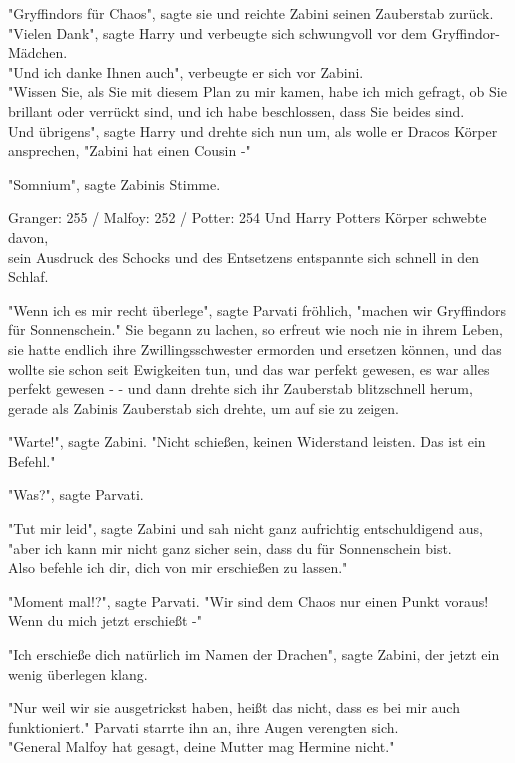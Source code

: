 {"Gryffindors für Chaos", sagte sie und reichte Zabini seinen Zauberstab zurück.\\ "Vielen Dank", sagte Harry und verbeugte sich schwungvoll vor dem Gryffindor-Mädchen.\\ "Und ich danke Ihnen auch", verbeugte er sich vor Zabini.\\ "Wissen Sie, als Sie mit diesem Plan zu mir kamen, habe ich mich gefragt, ob Sie brillant oder verrückt sind, und ich habe beschlossen, dass Sie beides sind.\\ Und übrigens", sagte Harry und drehte sich nun um, als wolle er Dracos Körper ansprechen, "Zabini hat einen Cousin -"

"Somnium", sagte Zabinis Stimme.

Granger: 255 / Malfoy: 252 / Potter: 254 Und Harry Potters Körper schwebte davon,\\ sein Ausdruck des Schocks und des Entsetzens entspannte sich schnell in den Schlaf.

"Wenn ich es mir recht überlege", sagte Parvati fröhlich, "machen wir Gryffindors für Sonnenschein." Sie begann zu lachen, so erfreut wie noch nie in ihrem Leben, sie hatte endlich ihre Zwillingsschwester ermorden und ersetzen können, und das wollte sie schon seit Ewigkeiten tun, und das war perfekt gewesen, es war alles perfekt gewesen - - und dann drehte sich ihr Zauberstab blitzschnell herum, gerade als Zabinis Zauberstab sich drehte, um auf sie zu zeigen.

"Warte!", sagte Zabini. "Nicht schießen, keinen Widerstand leisten. Das ist ein Befehl."

"Was?", sagte Parvati.

"Tut mir leid", sagte Zabini und sah nicht ganz aufrichtig entschuldigend aus,\\ "aber ich kann mir nicht ganz sicher sein, dass du für Sonnenschein bist.\\ Also befehle ich dir, dich von mir erschießen zu lassen."

"Moment mal!?", sagte Parvati. "Wir sind dem Chaos nur einen Punkt voraus!\\ Wenn du mich jetzt erschießt -"

"Ich erschieße dich natürlich im Namen der Drachen", sagte Zabini, der jetzt ein wenig überlegen klang.

"Nur weil wir sie ausgetrickst haben, heißt das nicht, dass es bei mir auch funktioniert." Parvati starrte ihn an, ihre Augen verengten sich.\\ "General Malfoy hat gesagt, deine Mutter mag Hermine nicht."

}
